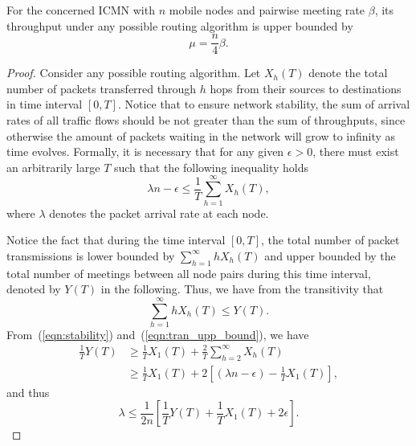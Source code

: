 \documentclass[twocolumn, 10pt]{svjour3}         \smartqed  \usepackage{graphicx}
\begin{document}
\begin{lemma}\label{lemma:necessity}
For the concerned ICMN with $n$ mobile nodes and pairwise meeting rate $\beta$, its throughput under any possible routing  algorithm  is upper bounded by
	\begin{equation}
	\mu = \frac{n}{4} \beta.
\end{equation}
\end{lemma}
\begin{proof}
Consider any possible routing algorithm.
Let  $X_h(T)$ denote the total number of packets transferred through $h$ hops from their sources to  destinations in time interval $[0,T]$.
Notice that to ensure network stability, the sum of arrival rates of all traffic flows should be not greater than the sum of throughputs, since otherwise the amount of packets waiting in the network will grow to infinity as time evolves.
Formally, it is necessary that for any given $\epsilon > 0$, there must exist an arbitrarily large $T$ such that the following inequality  holds
\begin{equation}\label{eqn:stability}
	\lambda n - \epsilon \leq \frac{1}{T} \sum_{h=1}^{\infty} X_h(T),
\end{equation}
where $\lambda$ denotes the packet arrival rate at each node.

Notice the fact that during the time interval $[0,T]$, the total number of packet transmissions is lower bounded by $\sum_{h=1}^{\infty} h X_h(T)$ and upper bounded by the total number of meetings  between all node pairs during this time interval, denoted by $Y(T)$ in the following.
Thus,  we have from the transitivity that
\begin{equation}\label{eqn:tran_upp_bound}
	\sum_{h=1}^{\infty} h X_h(T) \leq Y(T).
\end{equation}
From~(\ref{eqn:stability}) and~(\ref{eqn:tran_upp_bound}), we have
\begin{align}
\frac{1}{T} Y(T) &\geq  \frac{1}{T} X_1 (T) +  \frac{2}{T} \sum_{h=2}^{\infty} X_h(T)\nonumber\\&\geq  \frac{1}{T} X_1 (T) + 2\left[(\lambda n - \epsilon) - \frac{1}{T} X_1 (T) \right],
\end{align}
and thus 
\begin{equation}\label{eqn:bound}
\lambda \leq \frac{1}{2n}\left [\frac{1}{T} Y(T) + \frac{1}{T} X_1 (T) + 2\epsilon \right].
\end{equation}


\end{proof}
\end{document}
